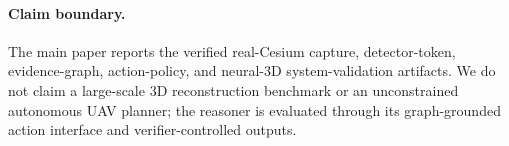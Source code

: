 \paragraph{Claim boundary.}
The main paper reports the verified real-Cesium capture, detector-token,
evidence-graph, action-policy, and neural-3D system-validation artifacts. We do not claim a
large-scale 3D reconstruction benchmark or an unconstrained autonomous UAV
planner; the reasoner is evaluated through its graph-grounded action interface
and verifier-controlled outputs.
